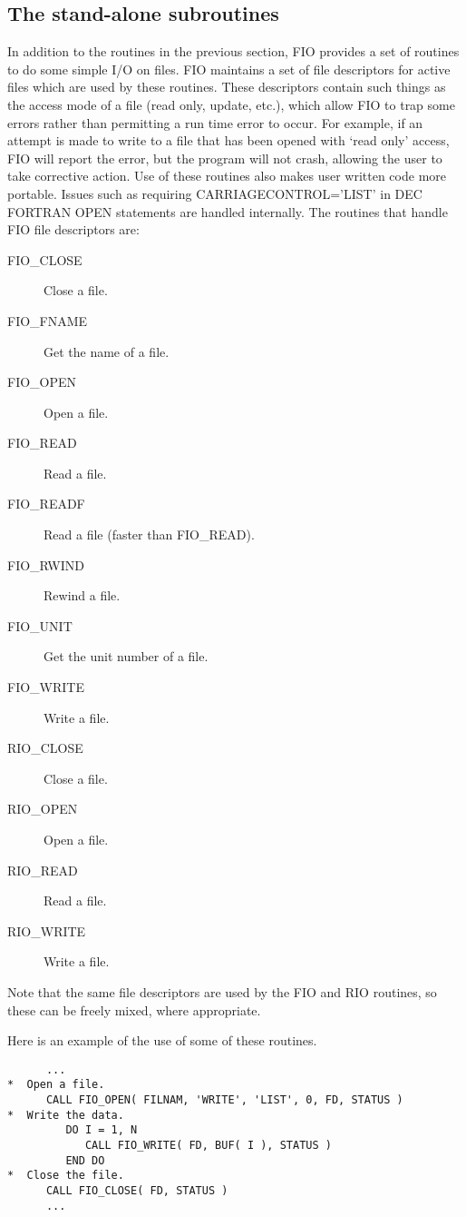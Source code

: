\subsection{The stand-alone subroutines}

In addition to the routines in the previous section, FIO provides a set of
routines to do some simple I/O on files. FIO maintains a set of file
descriptors for active files which are used by these routines. These
descriptors contain such things as the access mode of a file (read only,
update, etc.), which allow FIO to trap some errors rather than permitting a run
time error to occur. For example, if an attempt is made to write to a file that
has been opened with `read only' access, FIO will report the error, but the
program will not crash, allowing the user to take corrective action. Use of
these routines also makes user written code more portable. Issues such as
requiring CARRIAGECONTROL='LIST' in DEC FORTRAN OPEN statements are handled
internally. The routines that handle FIO file descriptors are:

\begin{description}
\item[FIO\_CLOSE] Close a file.
\item[FIO\_FNAME] Get the name of a file.
\item[FIO\_OPEN] Open a file.
\item[FIO\_READ]  Read a file.
\item[FIO\_READF] Read a file (faster than FIO\_READ).
\item[FIO\_RWIND] Rewind a file.
\item[FIO\_UNIT] Get the unit number of a file.
\item[FIO\_WRITE] Write a file.
\item[RIO\_CLOSE] Close a file.
\item[RIO\_OPEN] Open a file.
\item[RIO\_READ]  Read a file.
\item[RIO\_WRITE] Write a file.
\end{description}

Note that the same file descriptors are used by the FIO and RIO routines, so
these can be freely mixed, where appropriate.

Here is an example of the use of some of these routines.

\begin{verbatim}
      ...
*  Open a file.
      CALL FIO_OPEN( FILNAM, 'WRITE', 'LIST', 0, FD, STATUS )
*  Write the data.
         DO I = 1, N
            CALL FIO_WRITE( FD, BUF( I ), STATUS )
         END DO
*  Close the file.
      CALL FIO_CLOSE( FD, STATUS )
      ...
\end{verbatim}

